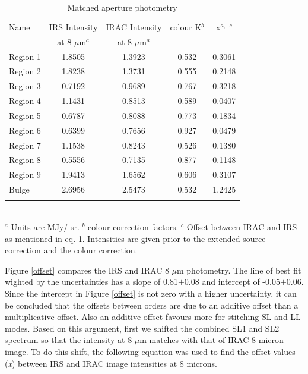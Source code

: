 \documentclass[useAMS,usenatbib,a4paper]{mn2e}
\begin{document}
\begin{table}
 \centering
 \begin{minipage}{90mm}
\caption{Matched aperture photometry}
  \begin{tabular}{lcccc}
  \hline{Name}&{IRS Intensity}&{IRAC Intensity}&{colour K$^b$}&{x$^{a,}$ $^c$} \\ {}&{at 8 $\mu$m$^a$}&{at 8 $\mu$m$^a$}&{}&{} 
   \\
 \hline

 Region 1 & 1.8505 & 1.3923 & 0.532 & 0.3061
 \\ Region 2  & 1.8238 & 1.3731 & 0.555 & 0.2148
 \\ Region 3 & 0.7192 & 0.9689 & 0.767 & 0.3218
 \\ Region 4 & 1.1431 & 0.8513 & 0.589 & 0.0407
 \\  Region 5 & 0.6787 & 0.8088 & 0.773 & 0.1834
 \\  Region 6  & 0.6399 & 0.7656 & 0.927 & 0.0479
 \\  Region 7  & 1.1538 & 0.8243 & 0.526 & 0.1380
 \\ Region 8 & 0.5556 & 0.7135 & 0.877 & 0.1148
 \\  Region 9 & 1.9413 & 1.6562 & 0.606 & 0.3107 
 \\ Bulge & 2.6956 & 2.5473 & 0.532 & 1.2425\\

\hline
 \label{colourK}

\end{tabular}\\
 {$^a$ Units are MJy/ sr. $^b$ colour correction factors. $^c$ Offset between IRAC and IRS as mentioned in eq. 1. Intensities are given prior to the extended source correction and the colour correction.}
\end{minipage}
\end{table}


Figure \ref{offset} compares the IRS and IRAC 8 $\mu$m photometry. The line of best fit wighted by the uncertainties has a slope of 0.81$\pm$0.08 and intercept of -0.05$\pm$0.06.  Since the intercept in Figure \ref{offset} is not zero with a higher uncertainty, it can be concluded that the offsets between orders are due to an additive offset than a multiplicative offset. Also an additive offset favours more for stitching SL and LL modes. Based on this argument, first we shifted the combined SL1 and SL2 spectrum so that the intensity at 8 $\mu$m matches with that of IRAC 8 micron image. To do this shift, the following equation was used to find the offset values (\emph{x}) between IRS and IRAC image intensities at 8 microns. 
	
\end{document}

